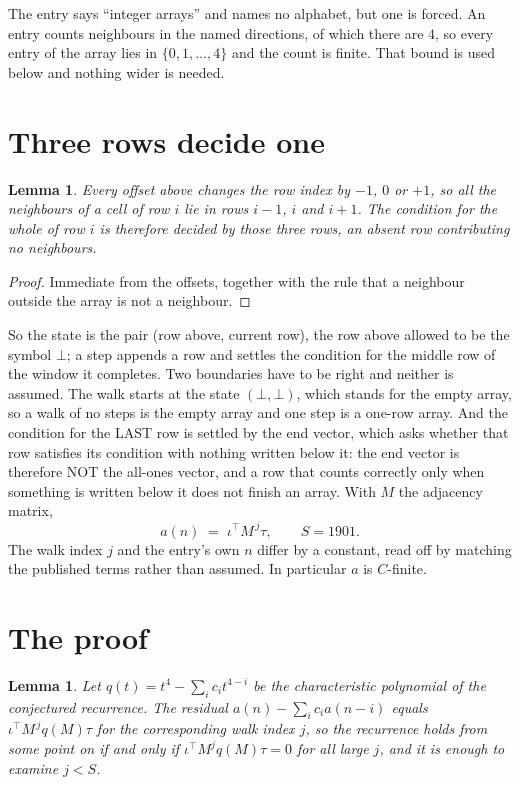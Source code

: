 \documentclass[11pt,a4paper]{article}
\theoremstyle{plain}
\newtheorem{lemma}[theorem]{Lemma}
\theoremstyle{definition}
\begin{document}
The entry says ``integer arrays'' and names no alphabet, but one is forced. An entry counts
neighbours in the named directions, of which there are $4$, so every entry of the array
lies in $\{0,1,\dots,4\}$ and the count is finite. That bound is used below and
nothing wider is needed.

\section{Three rows decide one}

\begin{lemma}\label{lem:win}
Every offset above changes the row index by $-1$, $0$ or $+1$, so all the neighbours of a cell
of row $i$ lie in rows $i-1$, $i$ and $i+1$. The condition for the whole of row $i$ is
therefore decided by those three rows, an absent row contributing no neighbours.
\end{lemma}

\begin{proof}
Immediate from the offsets, together with the rule that a neighbour outside the array is not a
neighbour.
\end{proof}

So the state is the pair (row above, current row), the row above allowed to be the symbol
$\bot$; a step appends a row and settles the condition for the middle row of the window it
completes. Two boundaries have to be right and neither is assumed. The walk starts at the state
$(\bot,\bot)$, which stands for the empty array, so a walk of no steps is the empty array and
one step is a one-row array. And the condition for the LAST row is settled by the end vector,
which asks whether that row satisfies its condition with nothing written below it: the end
vector is therefore NOT the all-ones vector, and a row that counts correctly only when
something is written below it does not finish an array. With $M$ the adjacency matrix,
\[
a(n)\;=\;\iota^{\!\top}M^{\,j}\tau ,\qquad S=1901.
\]
The walk index $j$ and the entry's own $n$ differ by a constant, read off by matching the
published terms rather than assumed. In particular $a$ is $C$-finite.

\section{The proof}

\begin{lemma}\label{lem:crit}
Let $q(t)=t^{4}-\sum_i c_it^{4-i}$ be the characteristic polynomial of the
conjectured recurrence. The residual $a(n)-\sum_ic_ia(n-i)$ equals
$\iota^{\!\top}M^{\,j}q(M)\tau$ for the corresponding walk index $j$, so the recurrence
holds from some point on if and only if $\iota^{\!\top}M^{j}q(M)\tau=0$ for all large $j$,
and it is enough to examine $j<S$.
\end{lemma}
\end{document}
